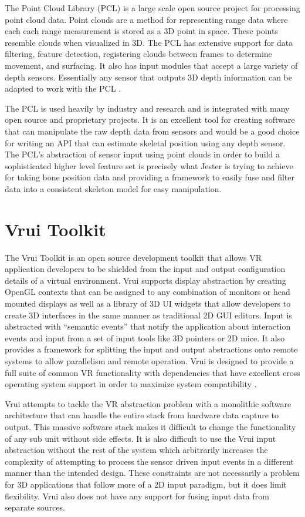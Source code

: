 The Point Cloud Library (PCL) is a large scale open source project for processing point cloud data. Point clouds are a method for representing range data where each each range measurement is stored as a 3D point in space. These points resemble clouds when visualized in 3D. The PCL has extensive support for data filtering, feature detection, registering clouds between frames to determine movement, and surfacing. It also has input modules that accept a large variety of depth sensors. Essentially any sensor that outputs 3D depth information can be adapted to work with the PCL \cite{rusu20113d}.

The PCL is used heavily by industry and research and is integrated with many open source and proprietary projects. It is an excellent tool for creating software that can manipulate the raw depth data from sensors and would be a good choice for writing an API that can estimate skeletal position using any depth sensor. The PCL’s abstraction of sensor input using point clouds in order to build a sophisticated higher level feature set is precisely what Jester is trying to achieve for taking bone position data and providing a framework to easily fuse and filter data into a consistent skeleton model for easy manipulation.

\section{Vrui Toolkit}

The Vrui Toolkit is an open source development toolkit that allows VR application developers to be shielded from the input and output configuration details of a virtual environment. Vrui supports display abstraction by creating OpenGL contexts that can be assigned to any combination of monitors or head mounted displays as well as a library of 3D UI widgets that allow developers to create 3D interfaces in the same manner as traditional 2D GUI editors. Input is abstracted with “semantic events” that notify the application about interaction events and input from a set of input tools like 3D pointers or 2D mice. It also provides a framework for splitting the input and output abstractions onto remote systems to allow parallelism and remote operation. Vrui is designed to provide a full suite of common VR functionality with dependencies that have excellent cross operating system support in order to maximize system compatibility \cite{kreylos2008environment}. 

Vrui attempts to tackle the VR abstraction problem with a monolithic software architecture that can handle the entire stack from hardware data capture to output. This massive software stack makes it difficult to change the functionality of any sub unit without side effects. It is also difficult to use the Vrui input abstraction without the rest of the system which arbitrarily increases the complexity of attempting to process the sensor driven input events in a different manner than the intended design. These constraints are not necessarily a problem for 3D applications that follow more of a 2D input paradigm, but it does limit flexibility. Vrui also does not have any support for fusing input data from separate sources.

